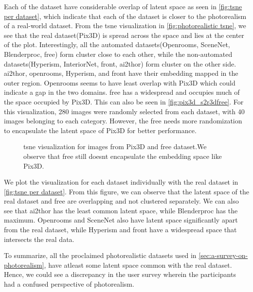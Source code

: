 Each of the dataset have considerable overlap of latent space as seen in \autoref{fig:tsne per dataset}, which indicate that each of the dataset is closer to the photorealism of a real-world dataset.
From the \gls{tsne} visualization in \autoref{fig:photorealistic tsne}, we see that the real dataset(Pix3D) is spread across the space and lies at the center of the plot.
Interestingly, all the automated datasets(Openrooms, SceneNet, Blenderproc, \gls{free}) form cluster close to each other, while the non-automated datasets(Hyperism, InteriorNet, \gls{front}, \gls{ai2thor}) form cluster on the other side.
\gls{ai2thor}, openrooms, Hyperism, and \gls{front} have their embedding mapped in the outer region.
Openrooms seems to have least overlap with Pix3D which could indicate a gap in the two domains.
\gls{free} has a widespread and occupies much of the space occupied by Pix3D.
This can also be seen in \autoref{fig:pix3d_s2r3dfree}.
For this visualization, 280  images were randomly selected from each dataset, with 40 images belonging to each category.
However, the \gls{free} needs more randomization to encapsulate the latent space of Pix3D for better performance.

\begin{figure}[ht]
    \centering
    \resizebox{0.75\textwidth}{8.5cm}{}
    \caption[\gls{tsne} for Pix3D and \gls{free}.]{\gls{tsne} visualization for images from Pix3D and \gls{free} dataset.We observe that \gls{free} still doesnt encapsulate the embedding space like Pix3D.}
    \label{fig:pix3d_s2r3dfree}
\end{figure}


We plot the visualization for each dataset individually with the real dataset in \autoref{fig:tsne per dataset}.
From this figure, we can observe that the latent space of the real dataset and \gls{free} are overlapping and not clustered separately.
We can also see that \gls{ai2thor} has the least common latent space, while Blenderproc has the maximum.
Openrooms and SceneNet also have latent space significantly apart from the real dataset, while Hyperism and \gls{front} have a widespread space that intersects the real data.

To summarize, all the proclaimed photorealistic datasets used in \autoref{sec:a-survey-on-photorealism}, have atleast some latent space common with the real dataset.
Hence, we could see a discrepancy in the user survey wherein the participants had a confused perspective of photorealism.


